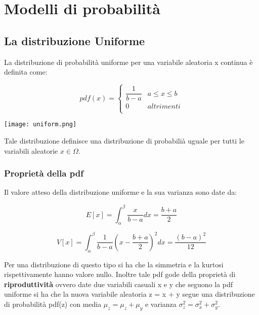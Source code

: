 
\setcounter{chapter}{1}
\chapter{Modelli di probabilit\`{a}}
	
\section{La distribuzione Uniforme}

La distribuzione di probabilit\`{a} uniforme per una variabile aleatoria x continua \`{e} definita come:
\vspace{0.3in}

  \begin{minipage}{.5\textwidth}
    \[ pdf(x) = 
	\begin{cases} 
      \dfrac{1}{b-a} & a \leq x \leq b \\
      0 & altrimenti \\ 
   \end{cases}
\]
  \end{minipage}
  \begin{minipage}{.4\textwidth}
    \centering
    \texttt{[image: uniform.png]}
 	
  \end{minipage}
\vspace{0.3in}

Tale distribuzione definisce una distribuzione di probabili\`{a} uguale per tutti le variabili aleatorie $x \in \Omega$. 

\subsection{Propriet\`{a} della pdf}
Il valore atteso della distribuzione uniforme e la sua varianza sono date da:

\begin{equation}
	E[x] = \int_{\alpha}^{\beta}{\dfrac{x}{b-a}dx} =\dfrac{b+a}{2} 
\end{equation}

\begin{equation}
	V[x] = \int_{\alpha}^{\beta}{\dfrac{1}{b-a}( x- \dfrac{b+a}{2})^2dx} = \dfrac{(b-a)^2}{12}
\end{equation}
\newline

\noindent Per una distribuzione di questo tipo si ha che la simmetria e la kurtosi rispettivamente hanno valore nullo.\newline
Inoltre tale pdf gode della propriet\`{a} di \textbf{riproduttivit\`{a}} ovvero date due variabili casuali x e y che seguono la pdf uniforme si ha che la nuova variabile aleatoria z = x + y segue una distribuzione di probabilit\`{a} pdf(z) con media $\mu_z = \mu_z + \mu_y$ e varianza $\sigma^2_z = \sigma_x^2 + \sigma_y^2$.\newline

